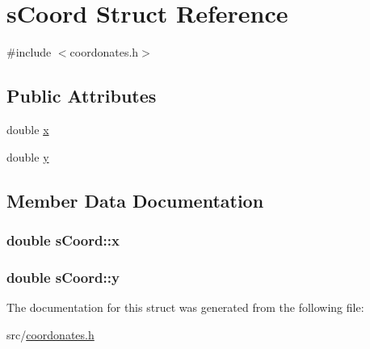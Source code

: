 \hypertarget{structs_coord}{}\section{s\+Coord Struct Reference}
\label{structs_coord}


{\ttfamily \#include $<$coordonates.\+h$>$}

\subsection*{Public Attributes}
\begin{DoxyCompactItemize}
\item 
double \hyperlink{structs_coord_aebc2748908bfc0b9b780a5ced9859cd0}{x}
\item 
double \hyperlink{structs_coord_ad7507a4bcfb7453f637721d3d265103e}{y}
\end{DoxyCompactItemize}


\subsection{Member Data Documentation}
\hypertarget{structs_coord_aebc2748908bfc0b9b780a5ced9859cd0}{}
\subsubsection[{x}]{\setlength{\rightskip}{0pt plus 5cm}double s\+Coord\+::x}\label{structs_coord_aebc2748908bfc0b9b780a5ced9859cd0}
\hypertarget{structs_coord_ad7507a4bcfb7453f637721d3d265103e}{}
\subsubsection[{y}]{\setlength{\rightskip}{0pt plus 5cm}double s\+Coord\+::y}\label{structs_coord_ad7507a4bcfb7453f637721d3d265103e}


The documentation for this struct was generated from the following file\+:\begin{DoxyCompactItemize}
\item 
src/\hyperlink{coordonates_8h}{coordonates.\+h}\end{DoxyCompactItemize}

